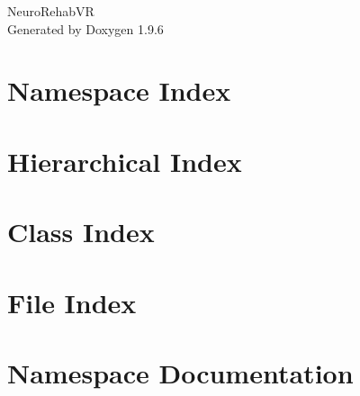 \documentclass[twoside]{book}
\newcommand{\+}{\discretionary{\mbox{\scriptsize$\hookleftarrow$}}{}{}}
\newcommand{\clearemptydoublepage}{%
    \newpage{\pagestyle{empty}\cleardoublepage}%
  }
\begin{document}
  \raggedbottom
    \hypersetup{pageanchor=false,
                bookmarksnumbered=true,
                pdfencoding=unicode
               }
  \begin{titlepage}
  \vspace*{7cm}
  \begin{center}%
  {\Large Neuro\+Rehab\+VR}\\
  \vspace*{1cm}
  {\large Generated by Doxygen 1.9.6}\\
  \end{center}
  \end{titlepage}
  \clearemptydoublepage
  \tableofcontents
  \clearemptydoublepage
  \hypersetup{pageanchor=true}
\chapter{Namespace Index}

\chapter{Hierarchical Index}

\chapter{Class Index}

\chapter{File Index}

\chapter{Namespace Documentation}





\end{document}

